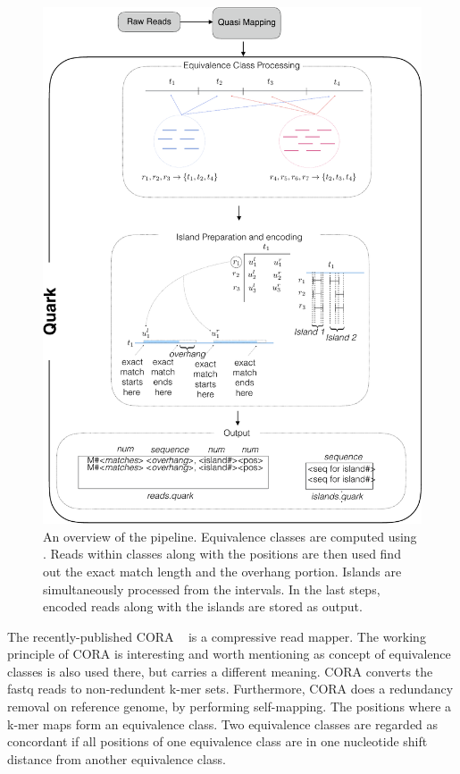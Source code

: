 \begin{figure}[!ht]
\includegraphics[width=\textwidth]{Figures/quark_overview4-crop}
\centering
\caption{\label{fig:overview_quark}An overview of the \quark pipeline. Equivalence classes are computed using \qm. Reads within classes along with the positions are then used find out the exact match length and the overhang portion. Islands are simultaneously processed from the intervals. In the last steps, encoded reads along with the islands are stored as \quark output.}
\end{figure}


The recently-published CORA ~\citep{Yorukoglu2016} is a compressive read mapper. The working principle of CORA is interesting and worth mentioning as concept of equivalence classes is also used there, but carries a different meaning. CORA converts the fastq reads to non-redundent k-mer sets. Furthermore, CORA does a redundancy removal on reference genome, by performing self-mapping. The positions where a k-mer maps form an equivalence class. Two equivalence classes are regarded as concordant if all positions of one equivalence class are in one nucleotide shift distance from another equivalence class. 

